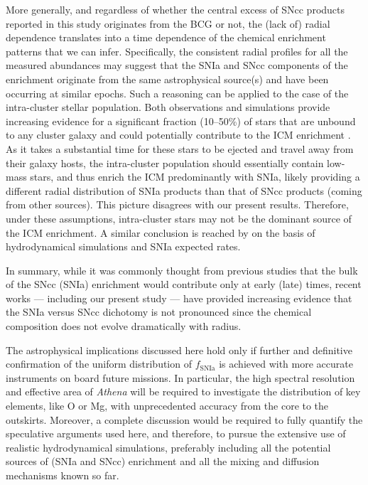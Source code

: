 \documentclass{aa}
\begin{document}
More generally, and regardless of whether the central excess of SNcc products reported in this study originates from the BCG or not, the (lack of) radial dependence translates into a time dependence of the chemical enrichment patterns that we can infer. Specifically, the consistent radial profiles for all the measured abundances may suggest that the SNIa and SNcc components of the enrichment originate from the same astrophysical source(s) and have been occurring at similar epochs. 
Such a reasoning can be applied to the case of the intra-cluster stellar population. Both observations \citep[e.g.][]{2006AJ....131..168K,2007AJ....134..466K} and simulations \citep{2004MNRAS.355..159W} provide increasing evidence for a significant fraction (10--50\%) of stars that are unbound to any cluster galaxy and could potentially contribute to the ICM enrichment \citep{2004A&A...425L..21D}. As it takes a substantial time for these stars to be ejected and travel away from their galaxy hosts, the intra-cluster population should essentially contain low-mass stars, and thus enrich the ICM predominantly with SNIa, likely providing a different radial distribution of SNIa products than that of SNcc products (coming from other sources). This picture disagrees with our present results. Therefore, under these assumptions, intra-cluster stars may not be the dominant source of the ICM enrichment. A similar conclusion is reached by \citet{2010A&A...516A..41K} on the basis of hydrodynamical simulations and SNIa expected rates.

In summary, while it was commonly thought from previous studies that the bulk of the SNcc (SNIa) enrichment would contribute only at early (late) times, recent works --- including our present study --- have provided increasing evidence that the SNIa versus SNcc dichotomy is not pronounced since the chemical composition does not evolve dramatically with radius.

The astrophysical implications discussed here hold only if further and definitive confirmation of the uniform distribution of $f_\text{SNIa}$ is achieved with more accurate instruments on board future missions. In particular, the high spectral resolution and effective area of \textit{Athena} will be required to investigate the distribution of key elements, like O or Mg, with unprecedented accuracy from the core to the outskirts. Moreover, a complete discussion would be required to fully quantify the speculative arguments used here, and therefore, to pursue the extensive use of realistic hydrodynamical simulations, preferably including all the potential sources of (SNIa and SNcc) enrichment and all the mixing and diffusion mechanisms known so far.
\end{document}
